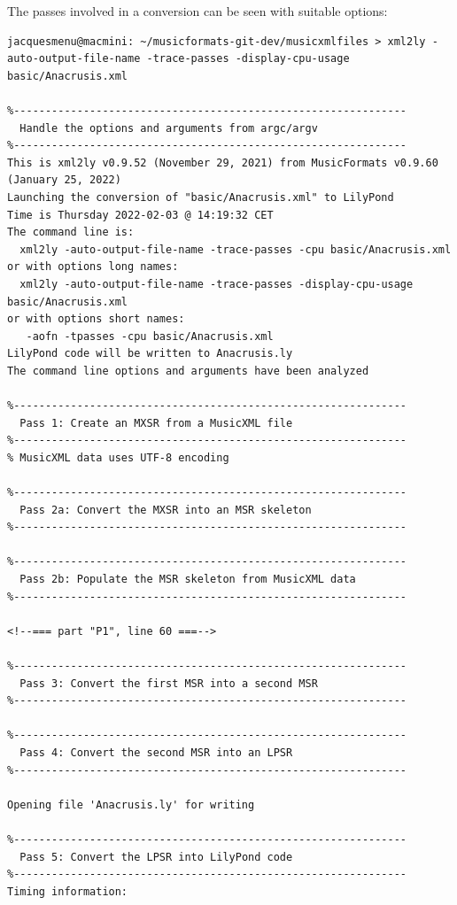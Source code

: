 The passes involved in a conversion can be seen with suitable %
options:
\begin{lstlisting}[language=Terminal]
jacquesmenu@macmini: ~/musicformats-git-dev/musicxmlfiles > xml2ly -auto-output-file-name -trace-passes -display-cpu-usage basic/Anacrusis.xml

%--------------------------------------------------------------
  Handle the options and arguments from argc/argv
%--------------------------------------------------------------
This is xml2ly v0.9.52 (November 29, 2021) from MusicFormats v0.9.60 (January 25, 2022)
Launching the conversion of "basic/Anacrusis.xml" to LilyPond
Time is Thursday 2022-02-03 @ 14:19:32 CET
The command line is:
  xml2ly -auto-output-file-name -trace-passes -cpu basic/Anacrusis.xml
or with options long names:
  xml2ly -auto-output-file-name -trace-passes -display-cpu-usage basic/Anacrusis.xml
or with options short names:
   -aofn -tpasses -cpu basic/Anacrusis.xml
LilyPond code will be written to Anacrusis.ly
The command line options and arguments have been analyzed

%--------------------------------------------------------------
  Pass 1: Create an MXSR from a MusicXML file
%--------------------------------------------------------------
% MusicXML data uses UTF-8 encoding

%--------------------------------------------------------------
  Pass 2a: Convert the MXSR into an MSR skeleton
%--------------------------------------------------------------

%--------------------------------------------------------------
  Pass 2b: Populate the MSR skeleton from MusicXML data
%--------------------------------------------------------------

<!--=== part "P1", line 60 ===-->

%--------------------------------------------------------------
  Pass 3: Convert the first MSR into a second MSR
%--------------------------------------------------------------

%--------------------------------------------------------------
  Pass 4: Convert the second MSR into an LPSR
%--------------------------------------------------------------

Opening file 'Anacrusis.ly' for writing

%--------------------------------------------------------------
  Pass 5: Convert the LPSR into LilyPond code
%--------------------------------------------------------------
Timing information:


\end{lstlisting}
